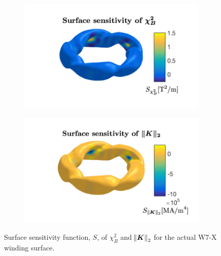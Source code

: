 \documentclass[aps,unsortedaddress]{revtex4-1}
\begin{document}
\FloatBarrier
\begin{figure}
\begin{subfigure}[b]{0.4\textwidth}
\includegraphics[width=1\textwidth]{chi2_B_S.png}
\end{subfigure}
\begin{subfigure}[b]{0.4\textwidth}
\includegraphics[width=1\textwidth]{rms_K_S.png}
\end{subfigure}
\caption{Surface sensitivity function, $S$, of $\chi^2_B$ and $\norm{\bm{K}}_2$ for the actual W7-X winding surface. }
\label{w7x_sensitivity}
\end{figure}
\end{document}
